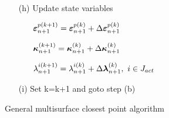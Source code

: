 \documentclass[epsf,a4paper]{article}
\newcommand{\mbf}[1]{\mbox{\boldmath$#1$}}
\newcommand{\e}{\mbf{\varepsilon}}
\newcommand{\sig}{\mbf{\sigma}}
\newcommand{\kap}{\mbf{\kappa}}
\begin{document}
\begin{table}
{\begin{enumerate}
\begin{enumerate}
\begin{itemize}
    \item[]
      $\Delta\kap^{(k)}_{n+1} = \dot{\mbf{\kappa}}(\sig^{(k)_{n+1}}, \mbf{\lambda}^{k}_{n+1})$
    \end{itemize}
  \item[(h)]
    Update state variables
    \begin{itemize}
    \item[]
      $\e^{p(k+1)}_{n+1}=\e^{p(k)}_{n+1}+\Delta\e^{p(k)}_{n+1}$
    \item[]
      $\kap^{(k+1)}_{n+1}=\kap^{(k)}_{n+1}+\Delta\kap^{(k)}_{n+1}$
    \item[]
      $\lambda^{i(k+1)}_{n+1}=\lambda^{i(k)}_{n+1}+\Delta\mbf{\lambda}^{(k)}_{n+1},\ i\in J_{act}$
    \end{itemize}
  \item[(i)]
    Set k=k+1 and goto step (b)
  \end{enumerate}
\end{enumerate}
}
\caption{General multisurface closest point algorithm}
\end{table}
\end{document}

